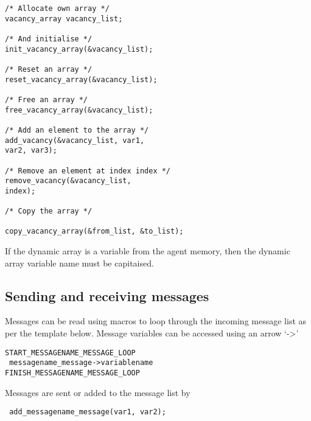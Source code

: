 \begin{mylisting}
\begin{verbatim}
/* Allocate own array */
vacancy_array vacancy_list;

/* And initialise */
init_vacancy_array(&vacancy_list);

/* Reset an array */
reset_vacancy_array(&vacancy_list);

/* Free an array */
free_vacancy_array(&vacancy_list);

/* Add an element to the array */
add_vacancy(&vacancy_list, var1,
var2, var3);

/* Remove an element at index index */
remove_vacancy(&vacancy_list,
index);

/* Copy the array */

copy_vacancy_array(&from_list, &to_list);
\end{verbatim}
\end{mylisting}

If the dynamic array is a variable from the agent memory, then the dynamic
array variable name must be capitaised.

\subsection{Sending and receiving messages}

Messages can be read using macros to loop through the incoming message list as per the template below.
Message variables can be accessed using an arrow `->'

\begin{mylisting}
\begin{verbatim}
START_MESSAGENAME_MESSAGE_LOOP
 messagename_message->variablename
FINISH_MESSAGENAME_MESSAGE_LOOP
\end{verbatim}
\end{mylisting}

Messages are sent or added to the message list by
\begin{mylisting}
\begin{verbatim}
 add_messagename_message(var1, var2);
\end{verbatim}
\end{mylisting}

